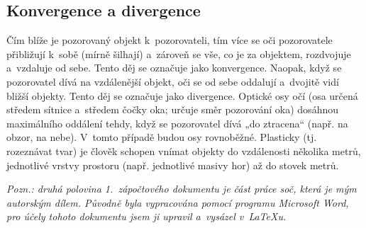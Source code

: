\documentclass{article}
\begin{document}
\subsection{Konvergence a divergence}
Čím blíže je pozorovaný objekt k~pozorovateli, tím více se oči pozorovatele přibližují k~sobě (mírně šilhají) a~zároveň se vše, co je za objektem, rozdvojuje a~vzdaluje od sebe. Tento děj se označuje jako konvergence. Naopak, když se pozorovatel dívá na vzdálenější objekt, oči se od sebe oddalují a~dvojitě vidí bližší objekty. Tento děj se označuje jako divergence. Optické osy očí (osa určená středem sítnice a~středem čočky oka; určuje směr pozorování oka) dosáhnou maximálního oddálení tehdy, když se pozorovatel dívá „do ztracena“ (např. na obzor, na nebe). V~tomto případě budou osy rovnoběžné. Plasticky (tj. rozeznávat tvar) je člověk schopen vnímat objekty do vzdálenosti několika metrů, jednotlivé vrstvy prostoru (např. jednotlivé masivy hor) až do stovek metrů.


\vspace{5mm}
\noindent\makebox[\linewidth]{\rule{\paperwidth}{0.4pt}}

\textit{Pozn.: druhá polovina 1.~zápočtového dokumentu je část práce soč, která je mým autorským dílem. Původně byla vypracována pomocí programu Microsoft Word, pro účely tohoto dokumentu jsem ji upravil a~vysázel v~\LaTeX u.}


\end{document}
